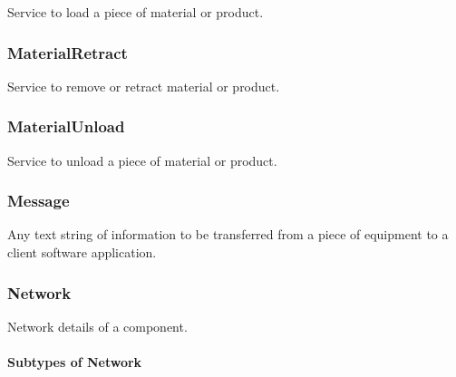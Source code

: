 Service to load a piece of material or product.


\subsubsection{MaterialRetract}
\label{sec:MaterialRetract}



Service to remove or retract material or product.


\subsubsection{MaterialUnload}
\label{sec:MaterialUnload}



Service to unload a piece of material or product.


\subsubsection{Message}
\label{sec:Message}



Any text string of information to be transferred from a piece of equipment to a client software application.


\subsubsection{Network}
\label{sec:Network}



Network details of a component.


\paragraph{Subtypes of Network}\mbox{}
\label{sec:Subtypes of Network}

